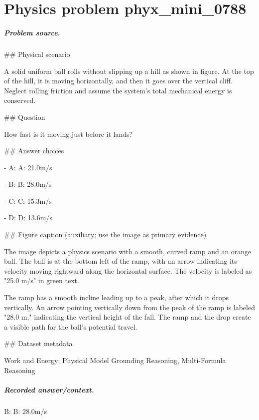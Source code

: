 
\chapter{Physics problem phyx\_mini\_0788}
\label{ch:PhyXMiniProblems_problem_phyx_mini_0788}

\paragraph{Problem source.}
\#\# Physical scenario

A solid uniform ball rolls without slipping up a hill as shown in figure. At the top of the hill, it is moving horizontally, and then it goes over the vertical cliff. Neglect rolling friction and assume the system’s total mechanical energy is conserved.

\#\# Question

How fast is it moving just before it lands?

\#\# Answer choices

- A: A: 21.0m/s

- B: B: 28.0m/s

- C: C: 15.3m/s

- D: D: 13.6m/s

\#\# Figure caption (auxiliary; use the image as primary evidence)

The image depicts a physics scenario with a smooth, curved ramp and an orange ball. The ball is at the bottom left of the ramp, with an arrow indicating its velocity moving rightward along the horizontal surface. The velocity is labeled as "25.0 m/s" in green text. 

The ramp has a smooth incline leading up to a peak, after which it drops vertically. An arrow pointing vertically down from the peak of the ramp is labeled "28.0 m," indicating the vertical height of the fall. The ramp and the drop create a visible path for the ball's potential travel.

\#\# Dataset metadata

Work and Energy; Physical Model Grounding Reasoning, Multi-Formula Reasoning

\paragraph{Recorded answer/context.}
B: B: 28.0m/s

